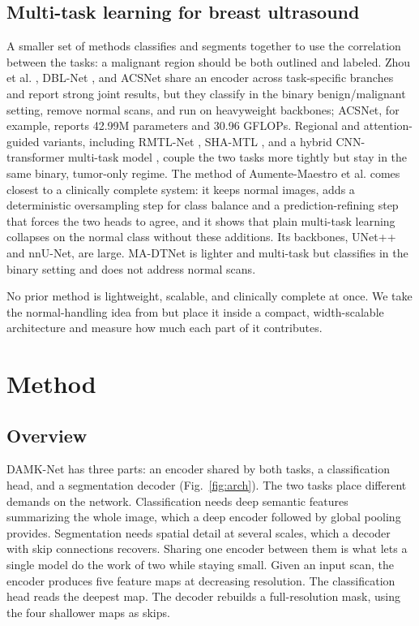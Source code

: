 \documentclass[runningheads]{llncs}
\begin{document}
\subsection{Multi-task learning for breast ultrasound}
A smaller set of methods classifies and segments together to use the correlation
between the tasks: a malignant region should be both outlined and labeled. Zhou
et al. \cite{Zhou}, DBL-Net \cite{DBL}, and ACSNet \cite{ACSNet} share an encoder
across task-specific branches and report strong joint results, but they classify
in the binary benign\slash malignant setting, remove normal scans, and run on
heavyweight backbones; ACSNet, for example, reports 42.99M parameters and 30.96
GFLOPs. Regional and attention-guided variants, including RMTL-Net \cite{RMTLNet},
SHA-MTL \cite{SHAMTL}, and a hybrid CNN-transformer multi-task model
\cite{Shareef}, couple the two tasks more tightly but stay in the same binary,
tumor-only regime. The method of Aumente-Maestro et al. \cite{CMPB} comes closest
to a clinically complete system: it keeps normal images, adds a deterministic
oversampling step for class balance and a prediction-refining step that forces
the two heads to agree, and it shows that plain multi-task learning collapses on
the normal class without these additions. Its backbones, UNet++ and nnU-Net, are
large. MA-DTNet \cite{MADTNet} is lighter and multi-task but classifies in the
binary setting and does not address normal scans.

No prior method is lightweight, scalable, and clinically complete at once. We take
the normal-handling idea from \cite{CMPB} but place it inside a compact,
width-scalable architecture and measure how much each part of it contributes.

\section{Method}
\subsection{Overview}
DAMK-Net has three parts: an encoder shared by both tasks, a classification head,
and a segmentation decoder (Fig.~\ref{fig:arch}). The two tasks place different
demands on the network. Classification needs deep semantic features summarizing
the whole image, which a deep encoder followed by global pooling provides.
Segmentation needs spatial detail at several scales, which a decoder with skip
connections recovers. Sharing one encoder between them is what lets a single
model do the work of two while staying small. Given an input scan, the encoder
produces five feature maps at decreasing resolution. The classification head
reads the deepest map. The decoder rebuilds a full-resolution mask, using the
four shallower maps as skips.
\end{document}
